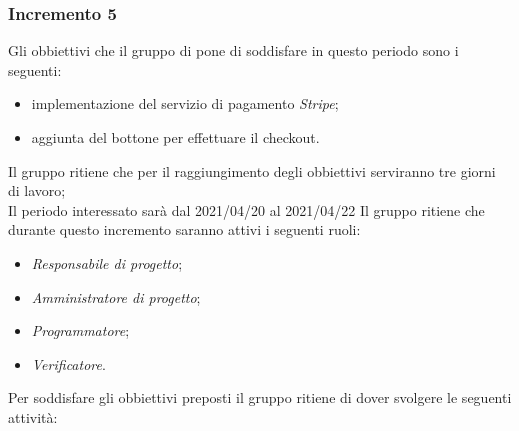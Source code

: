 \subsubsection{Incremento 5}
Gli obbiettivi che il gruppo di pone di soddisfare in questo periodo sono i seguenti:
\begin{itemize}
    \item implementazione del servizio di pagamento \textit{Stripe};
    \item aggiunta del bottone per effettuare il checkout.
\end{itemize}
Il gruppo ritiene che per il raggiungimento degli obbiettivi serviranno tre giorni di lavoro;\\
Il periodo interessato sarà dal 2021/04/20 al 2021/04/22
Il gruppo ritiene che durante questo incremento saranno attivi i seguenti ruoli:
\begin{itemize}
    \item \textit{Responsabile di progetto};
    \item \textit{Amministratore di progetto};
    \item \textit{Programmatore};
    \item \textit{Verificatore}.
\end{itemize}
Per soddisfare gli obbiettivi preposti il gruppo ritiene di dover svolgere le seguenti attività:
